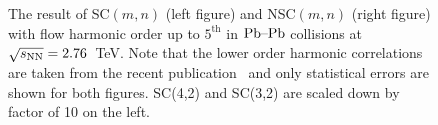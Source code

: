 \documentclass[ALICE,manyauthors]{cernphprep}
\begin{document}
\begin{figure}[htbp]
            \begin{center}
        \caption{The result of SC$(m,n)$ (left figure) and NSC$(m,n)$ (right figure) with flow harmonic order up to $5^{\mathrm{th}}$ in $\textnormal{Pb--Pb}$ collisions at $\sqrt{s_{\textnormal{NN}}}=2.76$~TeV. Note that the lower order harmonic correlations are taken from the recent publication~\cite{ALICE:2016kpq} and only statistical errors are shown for both figures. SC(4,2) and SC(3,2) are scaled down by factor of 10 on the left.}
        \label{fig:Figure_1}
              \end{center}
\end{figure}
\end{document}
